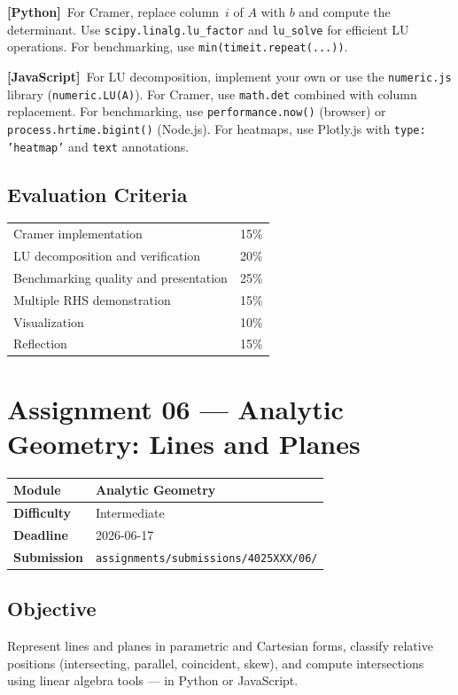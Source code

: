 \documentclass[a4paper,11pt]{article}
\newcommand{\assignmentmeta}[4]{%
  \noindent
  \begin{tabularx}{\textwidth}{
    >{\bfseries\color{ippblue}\cellcolor{lightblue}}p{3cm}
    X}
    \arrayrulecolor{gray!40}\hline
    Module     & #1 \\ \hline
    Difficulty & #2 \\ \hline
    Deadline   & #3 \\ \hline
    Submission & \texttt{assignments/submissions/4025XXX/#4/} \\ \hline
  \end{tabularx}
  \vspace{0.8em}
}
\newcommand{\pylabel}{\textcolor{pyborder}{\textbf{[Python]}}}
\newcommand{\jslabel}{\textcolor{jsborder}{\textbf{[JavaScript]}}}
\begin{document}
\begin{hintbox}
  \pylabel\ For Cramer, replace column~$i$ of $A$ with $b$ and compute the determinant. Use \texttt{scipy.linalg.lu\_factor} and \texttt{lu\_solve} for efficient LU operations. For benchmarking, use \texttt{min(timeit.repeat(...))}.

  \medskip

  \jslabel\ For LU decomposition, implement your own or use the \texttt{numeric.js} library (\texttt{numeric.LU(A)}). For Cramer, use \texttt{math.det} combined with column replacement. For benchmarking, use \texttt{performance.now()} (browser) or \texttt{process.hrtime.bigint()} (Node.js). For heatmaps, use Plotly.js with \texttt{type: 'heatmap'} and \texttt{text} annotations.
\end{hintbox}

\subsection{Evaluation Criteria}

\begin{tabularx}{\textwidth}{X r}
  Cramer implementation & 15\% \\
  LU decomposition and verification & 20\% \\
  Benchmarking quality and presentation & 25\% \\
  Multiple RHS demonstration & 15\% \\
  Visualization & 10\% \\
  Reflection & 15\% \\
\end{tabularx}

\newpage

\section{Assignment 06 --- Analytic Geometry: Lines and Planes}

\assignmentmeta{Analytic Geometry}{Intermediate}{2026-06-17}{06}

\subsection{Objective}

Represent lines and planes in parametric and Cartesian forms, classify relative positions (intersecting, parallel, coincident, skew), and compute intersections using linear algebra tools --- in Python or JavaScript.
\end{document}
